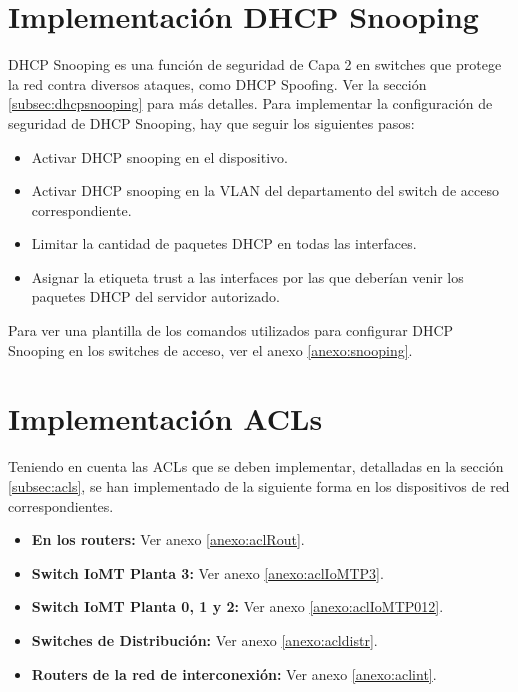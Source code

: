 \section{Implementación DHCP Snooping}
DHCP Snooping es una función de seguridad de Capa 2 en switches que protege la red contra diversos ataques, como DHCP Spoofing. Ver la sección \ref{subsec:dhcpsnooping} para más detalles. Para implementar la configuración de seguridad de DHCP Snooping, hay que seguir los siguientes pasos:
\begin{itemize}
    \item Activar DHCP snooping en el dispositivo.
    \item Activar DHCP snooping en la VLAN del departamento del switch de acceso correspondiente.
    \item Limitar la cantidad de paquetes DHCP en todas las interfaces.
    \item Asignar la etiqueta trust a las interfaces por las que deberían venir los paquetes DHCP del servidor autorizado.
\end{itemize}
Para ver una plantilla de los comandos utilizados para configurar DHCP Snooping en los switches de acceso, ver el anexo \ref{anexo:snooping}.

\section{Implementación ACLs}
Teniendo en cuenta las ACLs que se deben implementar, detalladas en la sección \ref{subsec:acls}, se han implementado de la siguiente forma en los dispositivos de red correspondientes.
\begin{itemize}
    \item \textbf{En los routers:} Ver anexo \ref{anexo:aclRout}.
    \item \textbf{Switch IoMT Planta 3:} Ver anexo \ref{anexo:aclIoMTP3}.
    \item \textbf{Switch IoMT Planta 0, 1 y 2:} Ver anexo \ref{anexo:aclIoMTP012}.
    \item \textbf{Switches de Distribución:} Ver anexo \ref{anexo:acldistr}.
    \item \textbf{Routers de la red de interconexión:} Ver anexo \ref{anexo:aclint}.
\end{itemize}


